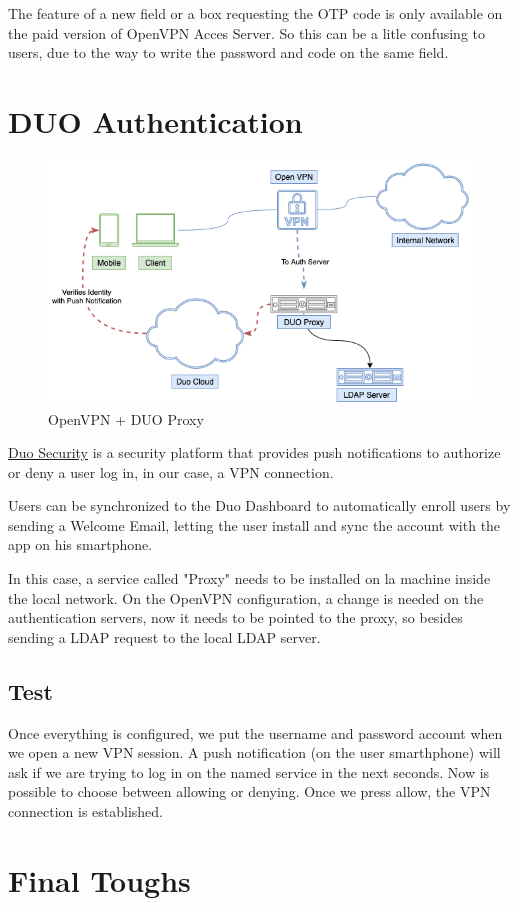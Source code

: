 The feature of a new field or a box requesting the OTP code is only available on the paid version of OpenVPN Acces Server.
So this can be a litle confusing to users, due to the way to write the password and code on the same field.




\newpage
\section{DUO Authentication}

\begin{figure}
  \centering
  \includegraphics[width=160mm]{images/duoOVPN.png}
  \caption{OpenVPN + DUO Proxy}
  \label{fig:label}
\end{figure}

\href{https://duo.com/}{Duo Security} is a security platform that provides push notifications to authorize or deny a user log in, in our case, a VPN connection.

Users can be synchronized to the Duo Dashboard to automatically enroll users by sending a Welcome Email, letting the user install and sync the account with the app on his smartphone.

In this case, a service called "Proxy" needs to be installed on la machine inside the local network. On the OpenVPN configuration, a change is needed on the authentication servers, now it needs to be pointed to the proxy, so besides sending a LDAP request to the local LDAP server.



\newpage
\subsection{Test}


Once everything is configured, we put the username and password account when we open a new VPN session. A push notification (on the user smarthphone) will ask if we are trying to log in on the named service in the next seconds.
Now is possible to choose between allowing or denying. Once we press allow, the VPN connection is established.



\newpage
\section{Final Toughs}
